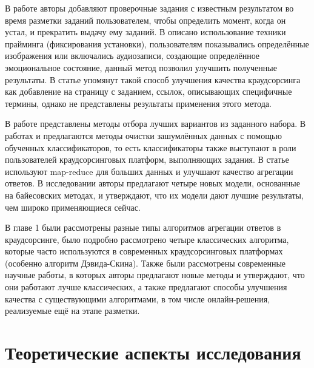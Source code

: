 \documentclass[specification,annotation,times]{itmo-student-thesis}
\begin{document}
В работе \cite{burmania2015increasing} авторы добавляют проверочные задания с известным результатом во время разметки заданий пользователем, чтобы определить момент, когда он устал, и прекратить выдачу ему заданий. В \cite{morris2012priming} описано использование техники прайминга (фиксирования установки), пользователям показывались определённые изображения или включались аудиозаписи, создающие определённое эмоциональное состояние, данный метод позволил улучшить полученные результаты. В статье \cite{lou2017use} упомянут такой способ улучшения качества краудсорсинга как добавление на страницу с заданием, ссылок, описывающих специфичные термины, однако не представлены результаты применения этого метода.

В работе \cite{lee2017crowdk} представлены методы отбора лучших вариантов из заданного набора. В работах \cite{nicholson2016label} и \cite{li2016noise} предлагаются методы очистки зашумлённых данных с помощью обученных классификаторов, то есть классификаторы также выступают в роли пользователей краудсорсинговых платформ, выполняющих задания. В статье \cite{dang2015crowdsourcing} используют map-reduce для больших данных и улучшают качество агрегации ответов. В исследовании \cite{kara2015modeling} авторы предлагают четыре новых модели, основанные на байесовских методах, и утверждают, что их модели дают лучшие результаты, чем широко применяющиеся сейчас.

\chapterconclusion
В главе 1 были рассмотрены разные типы алгоритмов агрегации ответов в краудсорсинге, было подробно рассмотрено четыре классических алгоритма, которые часто используются в современных краудсорсинговых платформах (особенно алгоритм Дэвида-Скина). Также были рассмотрены современные научные работы, в которых авторы предлагают новые методы и утверждают, что они работают лучше классических, а также предлагают способы улучшения качества с существующими алгоритмами, в том числе онлайн-решения, реализуемые ещё на этапе разметки.

\finishrelatedwork

\chapter{Теоретические аспекты исследования}
\end{document}
